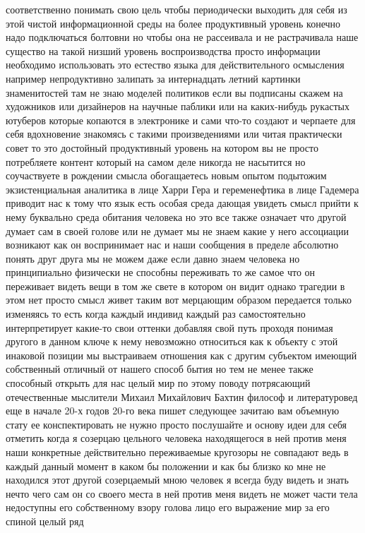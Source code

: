 соответственно понимать свою цель чтобы периодически выходить для себя из этой
чистой информационной среды на более продуктивный уровень конечно надо
подключаться болтовни но чтобы она не рассеивала и не растрачивала наше существо
на такой низший уровень воспроизводства просто информации необходимо
использовать это естество языка для действительного осмысления например
непродуктивно залипать за интернадцать летний картинки знаменитостей там не знаю
моделей политиков если вы подписаны скажем на художников или дизайнеров на
научные паблики или на каких-нибудь рукастых ютуберов которые копаются в
электронике и сами что-то создают и черпаете для себя вдохновение знакомясь с
такими произведениями или читая практически совет то это достойный продуктивный
уровень на котором вы не просто потребляете контент который на самом деле
никогда не насытится но соучаствуете в рождении смысла обогащаетесь новым опытом
подытожим экзистенциальная аналитика в лице Харри Гера и геременефтика в лице
Гадемера приводит нас к тому что язык есть особая среда дающая увидеть смысл
прийти к нему буквально среда обитания человека но это все также означает что
другой думает сам в своей голове или не думает мы не знаем какие у него
ассоциации возникают как он воспринимает нас и наши сообщения в пределе
абсолютно понять друг друга мы не можем даже если давно знаем человека но
принципиально физически не способны переживать то же самое что он переживает
видеть вещи в том же свете в котором он видит однако трагедии в этом нет просто
смысл живет таким вот мерцающим образом передается только изменяясь то есть
когда каждый индивид каждый раз самостоятельно интерпретирует какие-то свои
оттенки добавляя свой путь проходя понимая другого в данном ключе к нему
невозможно относиться как к объекту с этой инаковой позиции мы выстраиваем
отношения как с другим субъектом имеющий собственный отличный от нашего способ
бытия но тем не менее также способный открыть для нас целый мир по этому поводу
потрясающий отечественные мыслители Михаил Михайлович Бахтин философ и
литературовед еще в начале 20-х годов 20-го века пишет следующее зачитаю вам
объемную стату ее конспектировать не нужно просто послушайте и основу идеи для
себя отметить когда я созерцаю цельного человека находящегося в ней против меня
наши конкретные действительно переживаемые кругозоры не совпадают ведь в каждый
данный момент в каком бы положении и как бы близко ко мне не находился этот
другой созерцаемый мною человек я всегда буду видеть и знать нечто чего сам он
со своего места в ней против меня видеть не может части тела недоступны его
собственному взору голова лицо его выражение мир за его спиной целый ряд
